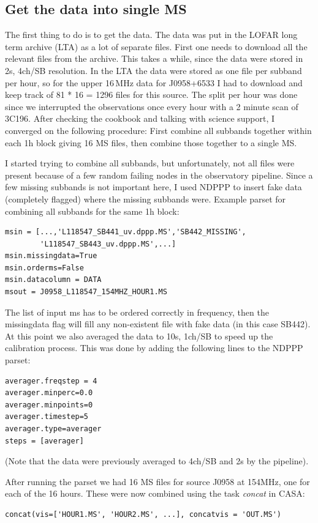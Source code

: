 \subsection{Get the data into single MS}
\label{sect:fakedata}
The first thing to do is to get the data. The data was put in the LOFAR long
term archive (LTA) as a lot of separate files. First one needs to download
all the relevant files from the archive. This
takes a while, since the data were stored in 2s, 4ch/SB resolution.
In the LTA the data were stored as one file per subband per hour,
so for the upper 16\,MHz data for J0958+6533 I had to download
and keep track of 81 * 16 = 1296 files for this source. 
The split per hour was done since we interrupted the observations once
every hour with a 2 minute scan of 3C196.
After checking the cookbook and talking with science support,
I converged on the following procedure: First combine all subbands together 
within each 1h block giving 16 MS files, then combine those together to a single MS.

I started trying to combine all subbands, but unfortunately, not all files 
were present because of a few random failing nodes
in the observatory pipeline. Since a few missing subbands is not important here,
I used NDPPP to insert fake data (completely flagged) where the missing subbands were.
Example parset for combining all subbands for the same 1h block:
\begin{lstlisting}
msin = [...,'L118547_SB441_uv.dppp.MS','SB442_MISSING',
        'L118547_SB443_uv.dppp.MS',...]
msin.missingdata=True
msin.orderms=False
msin.datacolumn = DATA
msout = J0958_L118547_154MHZ_HOUR1.MS
\end{lstlisting}
The list of input ms has to be ordered correctly in frequency, then the missingdata flag will fill any non-existent file with fake data
(in this case SB442).
At this point we also averaged the data to 10s, 1ch/SB to speed up the calibration process. 
This was done by adding the following lines to the NDPPP parset:
\begin{lstlisting}
averager.freqstep = 4
averager.minperc=0.0
averager.minpoints=0
averager.timestep=5
averager.type=averager
steps = [averager]
\end{lstlisting}
(Note that the data were previously averaged to 4ch/SB and 2s by the pipeline).

After running the parset we had 16 MS files for source J0958 at 154MHz, one for each of the 16 hours. These were now combined 
using the task \emph{concat} in CASA:
\begin{lstlisting}
concat(vis=['HOUR1.MS', 'HOUR2.MS', ...], concatvis = 'OUT.MS')
\end{lstlisting}

